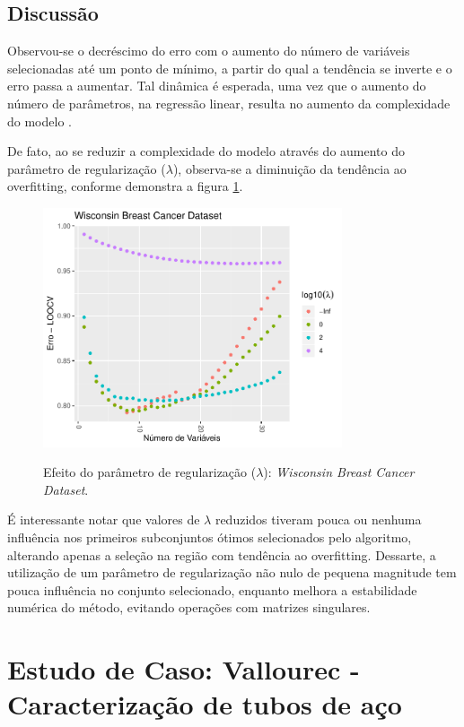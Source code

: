 \subsection{Discussão}

Observou-se o decréscimo do erro com o aumento do número de variáveis selecionadas até um ponto de mínimo, a partir do qual a tendência se inverte e o erro passa a aumentar. Tal dinâmica é esperada, uma vez que o aumento do número de parâmetros, na regressão linear, resulta no aumento da complexidade do modelo \cite[p. 224]{statistical_learning}. 

De fato, ao se reduzir a complexidade do modelo através do aumento do parâmetro de regularização ($\lambda$), observa-se a diminuição da tendência ao overfitting, conforme demonstra a figura \ref{fig:lambda_WisconsinBreastCancer}.

\begin{figure}[!htb]
    \centering
    \caption{Efeito do parâmetro de regularização ($\lambda$): \textit{Wisconsin Breast Cancer Dataset}.}
    \includegraphics[height=200pt]{imgs/res/WisconsinBreastCancerDataset_lambda}
    \label{fig:lambda_WisconsinBreastCancer}
\end{figure}

É interessante notar que valores de $\lambda$ reduzidos tiveram pouca ou nenhuma influência nos primeiros subconjuntos ótimos selecionados pelo algoritmo, alterando apenas a seleção na região com tendência ao overfitting. Dessarte, a utilização de um parâmetro de regularização não nulo de pequena magnitude tem pouca influência no conjunto selecionado, enquanto melhora a estabilidade numérica do método, evitando operações com matrizes singulares.

\section{Estudo de Caso: Vallourec - Caracterização de tubos de aço}

